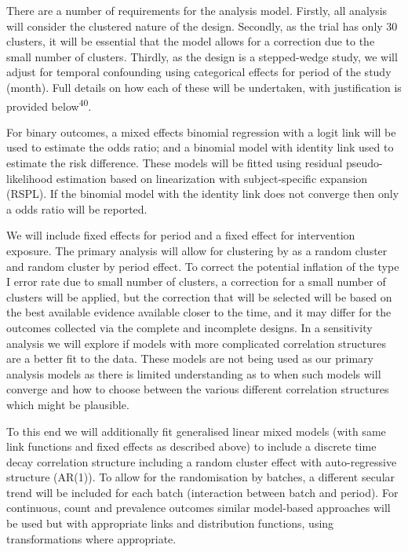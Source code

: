 \documentclass[
]{scrartcl}
\begin{document}
There are a number of requirements for the analysis model. Firstly, all
analysis will consider the clustered nature of the design. Secondly, as
the trial has only 30 clusters, it will be essential that the model
allows for a correction due to the small number of clusters. Thirdly, as
the design is a stepped-wedge study, we will adjust for temporal
confounding using categorical effects for period of the study (month).
Full details on how each of these will be undertaken, with justification
is provided below\textsuperscript{40}.

For binary outcomes, a mixed effects binomial regression with a logit
link will be used to estimate the odds ratio; and a binomial model with
identity link used to estimate the risk difference. These models will be
fitted using residual pseudo-likelihood estimation based on
linearization with subject-specific expansion (RSPL). If the binomial
model with the identity link does not converge then only a odds ratio
will be reported.

We will include fixed effects for period and a fixed effect for
intervention exposure. The primary analysis will allow for clustering by
as a random cluster and random cluster by period effect. To correct the
potential inflation of the type I error rate due to small number of
clusters, a correction for a small number of clusters will be applied,
but the correction that will be selected will be based on the best
available evidence available closer to the time, and it may differ for
the outcomes collected via the complete and incomplete designs. In a
sensitivity analysis we will explore if models with more complicated
correlation structures are a better fit to the data. These models are
not being used as our primary analysis models as there is limited
understanding as to when such models will converge and how to choose
between the various different correlation structures which might be
plausible.

To this end we will additionally fit generalised linear mixed models
(with same link functions and fixed effects as described above) to
include a discrete time decay correlation structure including a random
cluster effect with auto-regressive structure (AR(1)). To allow for the
randomisation by batches, a different secular trend will be included for
each batch (interaction between batch and period). For continuous, count
and prevalence outcomes similar model-based approaches will be used but
with appropriate links and distribution functions, using transformations
where appropriate.
\end{document}
